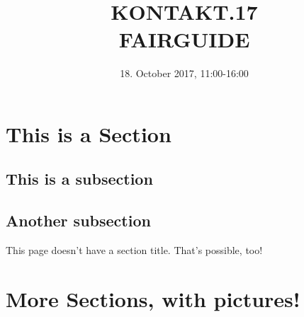\documentclass{amivbooklet}
\begin{document}
\title{KONTAKT.17 \\ FAIRGUIDE}
\date{18. October 2017, 11:00-16:00}

\maketitle

\section{This is a Section}

\blindtext

\subsection{This is a subsection}

\blindtext

\subsection{Another subsection}

\blindtext

\nextpage

This page doesn't have a section title. That's possible, too!

\bigbreak
\blindtext

\section{More Sections, with pictures!}

\blindtext

\nextpage

\blindtext\blindtext
{}
\blindtext
\end{document}
